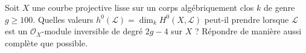 \begin{exercise}
\label{exercise-sections-degree-2g-minus-4}
Soit $X$ une courbe projective lisse sur un corps algébriquement clos
$k$ de genre $g \geq 100$. Quelles valeurs
$h^0(\mathcal{L}) = \dim_k H^0(X, \mathcal{L})$ peut-il prendre lorsque
$\mathcal{L}$ est un $\mathcal{O}_X$-module inversible de degré $2g - 4$
sur $X$ ? Répondre de manière aussi complète que possible.
\end{exercise}
















